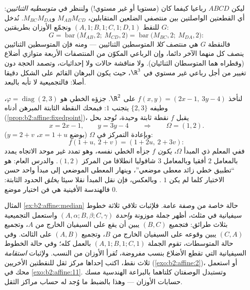 \begin{example}\label{ex:b2:affine:bimedians}
ليكن $ABCD$ رباعيا كيفما كان (مستويا أو غير مستوي!) ولننظر في
\emph{متوسطيه الثنائيين}: أي القطعتين الواصلتين بين منتصفي الضلعين
المتقابلين، $M_{AB}M_{CD}$ و$M_{BC}M_{DA}$. نُدخل  $G$ للنقط $(A,1; B,1; C,1; D,1)$
ونجمّع الأوزان بطريقتين:
\[
G = \operatorname{bar}\bigl(M_{AB}, 2;\ M_{CD}, 2\bigr)
= \operatorname{bar}\bigl(M_{BC}, 2;\ M_{DA}, 2\bigr) :
\]
فالنقطة $G$ هي منتصف \emph{كلا} المتوسطين الثنائيين --- ومنه فإن
المتوسطين الثنائيين ينصف كل منهما الآخر دائما، وإن الرباعي المكوّن
من المنتصفات الأربعة متوازي أضلاع (وقطراه هما المتوسطان الثنائيان).
ولا مناقشة حالات ولا إحداثيات، وتصمد الحجة دون تغيير من أجل رباعي
غير مستوي في $\R^3$، حيث يكون البرهان القائم على الشكل دقيقا أصلا:
فالتجميعية لا تأبه بالبعد.
\end{example}

\begin{example}\label{ex:b2:affine:dilation}
لنأخذ $f(x, y) = (2x - 1,\ 3y - 4)$ على $\R^2$. جزؤه الخطي هو $\varphi = \operatorname{diag}(2, 3)$، وطيفه $\{2, 3\}$ يتجنب
$1$: فبمحك النقطة الثابتة المبرهن أدناه (\cref{prop:b2:affine:fixedpoint})، يقبل $f$
نقطة ثابتة وحيدة، تُوجد بحل
\[
x = 2x - 1, \qquad y = 3y - 4
\qquad\Longrightarrow\qquad \Omega = (1, 2).
\]
وبإعادة التمركز في $\Omega$ (بوضع $x = 1 + u$، $y = 2 + v$):
\[
f(1 + u,\ 2 + v) = (1 + 2u,\ 2 + 3v) :
\]
ففي المعلم ذي المبدأ $\Omega$، \emph{يكون} $f$ جزأه الخطي نفسه،
وهو تمدد غير موحد الاتجاه يمدد بالمعامل $2$ أفقيا وبالمعامل
$3$ شاقوليا انطلاقا من المركز $(1, 2)$. والدرس العام:  هو ``تطبيق خطي زائد معطى موضعي''، وينهار المعطى الموضعي إلى
مبدأ واحد حسن الاختيار كلما لم يكن $1$ . وبالعكس، فإن
نقل المبدأ نقلا سيئا \emph{يخلق} الحدود الثابتة: فالهندسة الأفينية
هي فن اختيار موضع $0$.
\end{example}

\begin{remark}
المثال \cref{ex:b2:affine:median} حالة خاصة من وصفة عامة. فلإثبات تلاقي ثلاثة خطوط
سيفيانية في مثلث، أظهر جملة موزونة \emph{واحدة} $(A,
\alpha; B, \beta; C, \gamma)$ واستعمل
التجميعية بثلاث طرائق: فتجميع $(B, C)$ يبين أن  يقع على
السيفيان الخارج من $A$، وتجميع $(C, A)$ يبين وقوعه على السيفيان
الخارج من $B$، وتجميع $(A, B)$ على الثالث. وفي حالة المتوسطات،
تقوم الجملة $(A, 1; B, 1; C, 1)$ بالعمل كله؛ وفي حالة الخطوط السيفيانية التي تقطع
الأضلاع بنسب مفروضة، تُقرأ الأوزان من النسب. ولإثبات \emph{استقامة}
ثلاث نقط، اكتب إحداها مركز ثقل للنقطتين الأخريين (\cref{exo:b2:affine:2})، أو
استعمل محك  في \cref{exo:b2:affine:11}. وتستبدل الوصفتان كلتاهما بالبراعة
الهندسية مسك حسابات الأوزان --- وهذا بالضبط ما وُجد له حساب مراكز
الثقل.
\end{remark}

